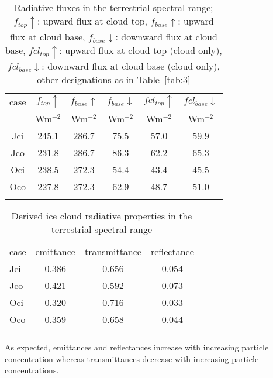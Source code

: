 \documentclass[agp]{svjour}
\begin{document}
\begin{table}
\caption{Radiative fluxes in the terrestrial spectral range; $f_{top}
\uparrow$: upward flux at cloud top, $f_{base} \uparrow$: upward flux at
cloud base, $f_{base} \downarrow$: downward flux at cloud base,
$fcl_{top} \uparrow$: upward flux at cloud top (cloud only), $fcl_{base}
\downarrow$: downward flux at cloud base (cloud only), other
designations as in Table~\ref{tab:3}}
\begin{tabular*}{84.22mm}{@{\hspace{0pt}\extracolsep{\fill}}cccccc@{\hspace{0pt}}}
\hline
\noalign{\smallskip}
case & $f_{top} \uparrow $ & $f_{base} \uparrow $ & $ f_{base} \downarrow $
& $fcl_{top} \uparrow $ & $fcl_{base} \downarrow $ \\
& Wm$^{-2}$ & Wm$^{-2}$ & Wm$^{-2}$ & Wm$^{-2}$ & Wm$^{-2}$ \\
\noalign{\smallskip}
\hline
\noalign{\smallskip}
Jci & 245.1 & 286.7 & 75.5 & 57.0 & 59.9 \\
Jco & 231.8 & 286.7 & 86.3 & 62.2 & 65.3 \\
Oci & 238.5 & 272.3 & 54.4 & 43.4 & 45.5 \\
Oco & 227.8 & 272.3 & 62.9 & 48.7 & 51.0 \\
\noalign{\smallskip}
\hline
\end{tabular*}
\label{tab:4}
\end{table}

\begin{table}[b]
\caption{Derived ice cloud radiative properties in the terrestrial spectral
range}
\begin{tabular*}{84.22mm}{@{\hspace{0pt}\extracolsep{\fill}}lccc@{\hspace{0pt}}}
\hline
\noalign{\smallskip}
case & emittance & transmittance & reflectance \\
\noalign{\smallskip}
\hline
\noalign{\smallskip}
Jci & 0.386 & 0.656 & 0.054 \\
Jco & 0.421 & 0.592 & 0.073 \\
Oci & 0.320 & 0.716 & 0.033 \\
Oco & 0.359 & 0.658 & 0.044 \\
\noalign{\smallskip}
\hline
\end{tabular*}
\label{tab:5}
\end{table}

As expected, emittances and reflectances increase with increasing particle
concentration whereas transmittances decrease with increasing particle
concentrations.
\end{document}
